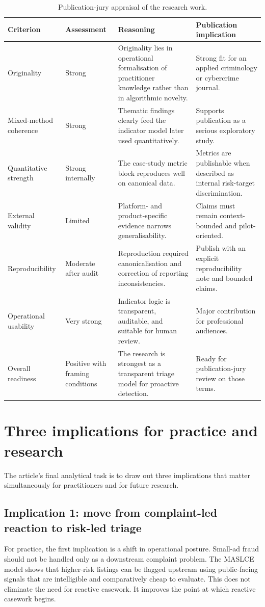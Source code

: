 \documentclass[11pt,a4paper]{article}
\begin{document}
\begin{table}[H]
\centering
\caption{Publication-jury appraisal of the research work.}
\begin{tabularx}{\textwidth}{p{3.0cm} p{2.1cm} Y Y}
\toprule
\textbf{Criterion} & \textbf{Assessment} & \textbf{Reasoning} & \textbf{Publication implication} \\
\midrule
Originality & Strong & Originality lies in operational formalisation of practitioner knowledge rather than in algorithmic novelty. & Strong fit for an applied criminology or cybercrime journal. \\
Mixed-method coherence & Strong & Thematic findings clearly feed the indicator model later used quantitatively. & Supports publication as a serious exploratory study. \\
Quantitative strength & Strong internally & The case-study metric block reproduces well on canonical data. & Metrics are publishable when described as internal risk-target discrimination. \\
External validity & Limited & Platform- and product-specific evidence narrows generalisability. & Claims must remain context-bounded and pilot-oriented. \\
Reproducibility & Moderate after audit & Reproduction required canonicalisation and correction of reporting inconsistencies. & Publish with an explicit reproducibility note and bounded claims. \\
Operational usability & Very strong & Indicator logic is transparent, auditable, and suitable for human review. & Major contribution for professional audiences. \\
Overall readiness & Positive with framing conditions & The research is strongest as a transparent triage model for proactive detection. & Ready for publication-jury review on those terms. \\
\bottomrule
\end{tabularx}
\end{table}

\section{Three implications for practice and research}
The article's final analytical task is to draw out three implications that matter simultaneously for practitioners and for future research.

\subsection{Implication 1: move from complaint-led reaction to risk-led triage}
For practice, the first implication is a shift in operational posture. Small-ad fraud should not be handled only as a downstream complaint problem. The MASLCE model shows that higher-risk listings can be flagged upstream using public-facing signals that are intelligible and comparatively cheap to evaluate. This does not eliminate the need for reactive casework. It improves the point at which reactive casework begins.
\end{document}
